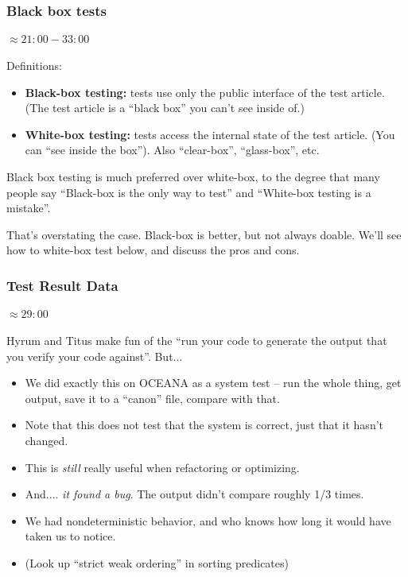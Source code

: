 \begin{frame}[fragile,t]
\frametitle{Black box tests}
\framesubtitle{$\approx 21:00 - 33:00$}
Definitions:
\begin{itemize}
  \item {\bf Black-box testing:} tests use only the public
    interface of the test article.  (The test article is a ``black box'' you can't see
    inside of.)
  \item {\bf White-box testing:} tests access the internal state of
    the test article. (You can ``see inside the box'').  Also
    ``clear-box'', ``glass-box'', etc.
\end{itemize}
\vskip 6pt
Black box testing is much preferred over white-box, to the degree that
many people say ``Black-box is the only way to test'' and ``White-box
testing is a mistake''.

\vskip 6pt
That's overstating the case.  Black-box is better, but not always
doable. We'll see how to white-box test below,
and discuss the pros and cons.

\end{frame}

\begin{frame}[fragile,t]
\frametitle{Test Result Data}
\framesubtitle{$\approx 29:00$}
Hyrum and Titus make fun of the ``run your code to generate the output
that you verify your code against''.  But...
\begin{itemize}[<+->]
\item We did exactly this on OCEANA as a system test -- run the whole
  thing, get output, save it to a ``canon'' file, compare with that.
\item Note that this does not test that the system is correct, just
  that it hasn't changed.
\item This is \emph{still} really useful when refactoring or
  optimizing.
\item And.... \emph{it found a bug}.  The output didn't compare
  roughly 1/3 times.
\item We had nondeterministic behavior, and who knows how long it
  would have taken us to notice.
\item (Look up ``strict weak ordering'' in sorting predicates)
\end{itemize}
\pause{}
\end{frame}



